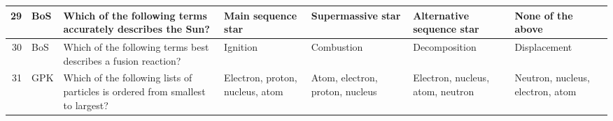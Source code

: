 \documentclass[10pt]{article}
\begin{document}
\begin{tiny}
\begin{longtable}{|r|p{0.375in}|p{1.275in}|p{0.75in}|p{0.75in}|p{0.75in}|p{0.75in}|}
    29    &     BoS &                                                                                                                                                                                                                       Which of the following terms accurately describes the Sun? &                                                                                                                    Main sequence star &                                                                                     Supermassive star &                                                                                                  Alternative sequence star &                                                                                                                 None of the above \\\hline
    30    &     BoS &                                                                                                                                                                                                                   Which of the following terms best describes a fusion reaction? &                                                                                                                              Ignition &                                                                                            Combustion &                                                                                                              Decomposition &                                                                                                                      Displacement \\\hline
    31    &      GPK &                                                                                                                                                                                                   Which of the following lists of particles is ordered from smallest to largest? &                                                                                                       Electron, proton, nucleus, atom &                                                                       Atom, electron, proton, nucleus &                                                                                           Electron, nucleus, atom, neutron &                                                                                                  Neutron, nucleus, electron, atom \\\hline

\end{longtable}
\end{tiny}
\end{document}
